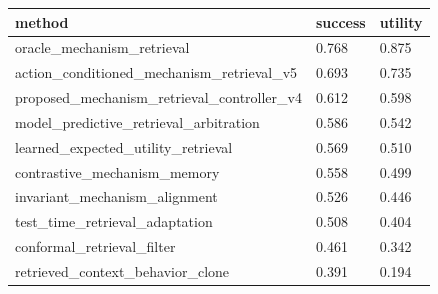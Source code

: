\begin{tabular}{lll}
\toprule
method & success & utility \\
\midrule
oracle\_mechanism\_retrieval & 0.768 & 0.875 \\
action\_conditioned\_mechanism\_retrieval\_v5 & 0.693 & 0.735 \\
proposed\_mechanism\_retrieval\_controller\_v4 & 0.612 & 0.598 \\
model\_predictive\_retrieval\_arbitration & 0.586 & 0.542 \\
learned\_expected\_utility\_retrieval & 0.569 & 0.510 \\
contrastive\_mechanism\_memory & 0.558 & 0.499 \\
invariant\_mechanism\_alignment & 0.526 & 0.446 \\
test\_time\_retrieval\_adaptation & 0.508 & 0.404 \\
conformal\_retrieval\_filter & 0.461 & 0.342 \\
retrieved\_context\_behavior\_clone & 0.391 & 0.194 \\
\bottomrule
\end{tabular}
